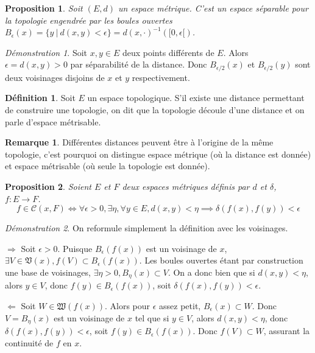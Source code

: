 \documentclass[a4paper, 11pt, french]{book}
\newenvironment{itemise}{\itemize}{\enditemize}
\theoremstyle{plain} %
\newtheorem{proposition}{Proposition}
\theoremstyle{definition} %
\newtheorem{definition}{Définition}
\newtheorem{remarque}{Remarque}
\theoremstyle{remark} %
\newtheorem*{demonstration}{Démonstration}
\newcommand{\1}{\mathds{1}}
\newcommand{\cont}{\mathcal{C}}
\newcommand{\inv}[1]{#1^{-1}}
\newcommand\ens[2]{\{#1 \ |\ #2\}}
\begin{document}
\begin{proposition}
	Soit $(E, d)$ un espace métrique.
	C'est un espace séparable pour la topologie engendrée par les boules ouvertes $B_\epsilon(x)=\ens{y}{d(x, y)<\epsilon}=\inv{d(x, \cdot)}([0, \epsilon[)$.
\end{proposition}

\begin{demonstration}
	Soit $x, y\in E$ deux points différents de $E$.
	Alors $\epsilon=d(x, y)>0$ par séparabilité de la distance.
	Donc $B_{\epsilon/2}(x)$ et $B_{\epsilon/2}(y)$ sont deux voisinages disjoins de $x$ et $y$ respectivement.
\end{demonstration}

\begin{definition}
	Soit $E$ un espace topologique.
	S’il existe une distance permettant de construire une topologie, on dit que la topologie découle d’une distance et on parle d’espace métrisable.
\end{definition}

\begin{remarque}
	Différentes distances peuvent être à l’origine de la même topologie, c’est pourquoi on distingue espace métrique (où la distance est donnée) et espace métrisable (où seule la topologie est donnée).
\end{remarque}

\begin{proposition}
	Soient $E$ et $F$ deux espaces métriques définis par $d$ et $\delta$, $f:E\rightarrow F$.
	$$
		f\in\cont(x, F)
		\iff
		\forall\epsilon>0, \exists\eta, \forall y\in E, d(x, y)<\eta\implies\delta(f(x), f(y))<\epsilon
	$$
\end{proposition}

\begin{demonstration}
	On reformule simplement la définition avec les voisinages.
	\begin{itemise}
		\item[$\Rightarrow$] Soit $\epsilon>0$.
		Puisque $B_\epsilon(f(x))$ est un voisinage de $x$, $\exists V\in\mathfrak{V}(x), f(V)\subset B_\epsilon(f(x))$.
		Les boules ouvertes étant par construction une base de voisinages, $\exists\eta>0, B_\eta(x)\subset V$.
		On a donc bien que si $d(x, y)<\eta$, alors $y\in V$, donc $f(y)\in B_\epsilon(f(x))$, soit $\delta(f(x), f(y))<\epsilon$.
		\item[$\Leftarrow$] Soit $W\in\mathfrak{W}(f(x))$.
		Alors pour $\epsilon$ assez petit, $B_\epsilon(x)\subset W$.
		Donc $V=B_\eta(x)$ est un voisinage de $x$ tel que si $y\in V$, alors $d(x, y)<\eta$, donc $\delta(f(x), f(y))<\epsilon$, soit $f(y)\in B_\epsilon(f(x))$.
		Donc $f(V)\subset W$, assurant la continuité de $f$ en $x$.
	\end{itemise}
\end{demonstration}
\end{document}
